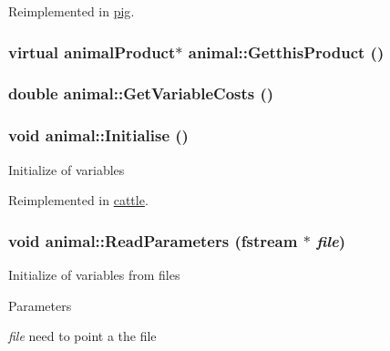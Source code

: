 Reimplemented in \hyperlink{classpig_a2320d7f431264ffed833fc93182787bb}{pig}.\hypertarget{classanimal_a877a5ba690a73859295c0b2150d4d99b}{
\subsubsection[{GetthisProduct}]{\setlength{\rightskip}{0pt plus 5cm}virtual {\bf animalProduct}$\ast$ animal::GetthisProduct ()}}
\label{classanimal_a877a5ba690a73859295c0b2150d4d99b}
\hypertarget{classanimal_a65c63e46f48ed826735c7eb075c36ae3}{
\subsubsection[{GetVariableCosts}]{\setlength{\rightskip}{0pt plus 5cm}double animal::GetVariableCosts ()}}
\label{classanimal_a65c63e46f48ed826735c7eb075c36ae3}
\hypertarget{classanimal_a06e14e53c94c2184ec43993b78b8d74b}{
\subsubsection[{Initialise}]{\setlength{\rightskip}{0pt plus 5cm}void animal::Initialise ()}}
\label{classanimal_a06e14e53c94c2184ec43993b78b8d74b}
Initialize of variables 

Reimplemented in \hyperlink{classcattle_a7a2111adbacdb6ec477005ac5779077b}{cattle}.\hypertarget{classanimal_ad7a71ab5ae87becfa921f70501cf4ee1}{
\subsubsection[{ReadParameters}]{\setlength{\rightskip}{0pt plus 5cm}void animal::ReadParameters (fstream $\ast$ {\em file})}}
\label{classanimal_ad7a71ab5ae87becfa921f70501cf4ee1}
Initialize of variables from files 
\begin{DoxyParams}{Parameters}
\item[{\em file}]need to point a the file \end{DoxyParams}


